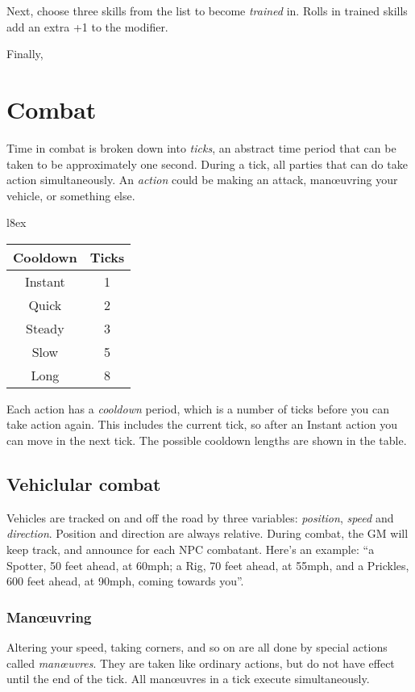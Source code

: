 \documentclass[10pt, a4paper, twocolumn]{article}
\begin{document}
Next, choose three skills from the list to become \emph{trained} in. Rolls in
trained skills add an extra +1 to the modifier.

Finally, 

\section{Combat}
Time in combat is broken down into \emph{ticks}, an abstract time period that
can be taken to be approximately one second. During a tick, all parties that
can do take action simultaneously. An \emph{action} could be making an attack,
man\oe{}uvring your vehicle, or something else.

\begin{wraptable}[6]{l}{8ex}
  \small
\vspace*{-3ex}
\hspace*{-5.5ex}
\begin{tabular}{cc}
  Cooldown & Ticks \\
  \hline 
  Instant  & 1     \\
  Quick    & 2     \\
  Steady   & 3     \\
  Slow     & 5     \\
  Long     & 8
\end{tabular}
\end{wraptable}

Each action has a \emph{cooldown} period, which is a number of ticks before you
can take action again. This includes the current tick, so after an Instant
action you can move in the next tick. The possible cooldown lengths are shown in
the table. 

\subsection{Vehiclular combat}
Vehicles are tracked on and off the road by three variables: \emph{position},
\emph{speed} and \emph{direction}. Position and direction are always relative.
During combat, the GM will keep track, and announce for each NPC combatant.
Here's an example: ``a Spotter, 50 feet ahead, at 60mph; a Rig, 70 feet ahead,
at 55mph, and a Prickles, 600 feet ahead, at 90mph, coming towards you''.

\subsubsection{Man\oe{}uvring}
Altering your speed, taking corners, and so on are all done by special actions
called \emph{man\oe{}uvres}. They are taken like ordinary actions, but do not
have effect until the end of the tick. All man\oe{}uvres in a tick execute
simultaneously. 
\end{document}
